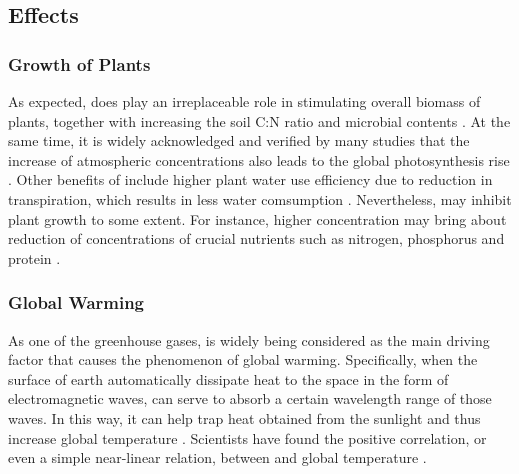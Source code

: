 \documentclass[12pt,a4paper]{article}
\begin{document}
    \subsection{Effects}
    \subsubsection{Growth of Plants}
    As expected,  does play an irreplaceable role in stimulating overall biomass of plants, together with increasing the soil C:N ratio and microbial  contents \autocite{de_graaff_interactions_2006}. At the same time, it is widely acknowledged and verified by many studies that the increase of atmospheric  concentrations also leads to the global photosynthesis rise \autocite{campbell_effects_1988,kramer_carbon_1981,qide_effects_1992}. Other benefits of  include higher plant water use efficiency due to reduction in transpiration, which results in less water comsumption \autocite{prior_review_2011}. Nevertheless,  may inhibit plant growth to some extent. For instance, higher  concentration may bring about reduction of concentrations of crucial nutrients such as nitrogen, phosphorus and protein \autocite{conroy_influence_1992}.
    \subsubsection{Global Warming}
    As one of the greenhouse gases,  is widely being considered as the main driving factor that causes the phenomenon of global warming. Specifically, when the surface of earth automatically dissipate heat to the space in the form of electromagnetic waves,  can serve to absorb a certain wavelength range of those waves. In this way, it can help trap heat obtained from the sunlight and thus increase global temperature \autocite{seim_influence_2020}. Scientists have found the positive correlation, or even a simple near-linear relation, between  and global temperature \autocite{matthews_proportionality_2009}.
\end{document}
